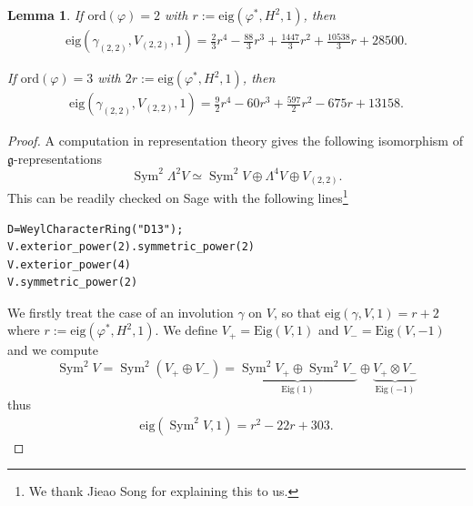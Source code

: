 \documentclass[a4paper,11pt]{amsart}
\newcommand{\eig}{{\mathrm{eig}}}
\newcommand{\Eig}{{\mathrm{Eig}}}
\newcommand{\V}[2]{V_{(#1,#2)}}
\newcommand{\ord}{{\mathrm{ord}}}
\DeclareMathOperator{\Sym}{Sym}
\theoremstyle{plain}
\newtheorem{lemma}[satz]{Lemma}
\theoremstyle{remark}
\begin{document}
\begin{lemma}\label{lem:V22-compuation}
If $\ord(\varphi) = 2$ with $r:=\eig(\varphi^*, H^2,1)$, then
    \begin{align}\label{eq:ord2-V22}
    \eig (\gamma_{(2,2)}, \V22, 1) =  \frac{2}{3}r^4 - \frac{88}{3}r^3 + \frac{1447}{3}r^2 + \frac{10538}{3}r + 28500.
    \end{align}
    
If $\ord(\varphi) = 3$ with $2r:=\eig(\varphi^*,H^2,1)$, then
    \begin{align}\label{eq:ord3-V22}
        \eig (\gamma_{(2,2)}, \V22, 1) =\frac{9}{2}r^4 - 60r^3 + \frac{597}{2}r^2 - 675r + 13158.
    \end{align}
\end{lemma}
\begin{proof}
A computation in representation theory
 gives the following isomorphism of $\mathfrak g$-representations
        \[
        \Sym^2 \Lambda^2 V \simeq \Sym^2 V \oplus \Lambda^4 V \oplus \V22.
        \] 
This can be readily checked on Sage \cite{sage} with the following lines\footnote{We thank Jieao Song for explaining this to us.}
\begin{verbatim}
D=WeylCharacterRing("D13");
V.exterior_power(2).symmetric_power(2)
V.exterior_power(4)
V.symmetric_power(2)
\end{verbatim}
We firstly treat the case of an involution $\gamma$ on $V$, so that $\eig(\gamma,V,1) = r+2$ where $r:= \eig(\varphi^*,H^2,1)$. We define $V_+ = \Eig(V,1)$ and $V_- = \Eig(V,-1)$ and we compute
\[
\Sym^2V = \Sym^2(V_+\oplus V_-) = \underbrace{\Sym^2 V_+ \oplus \Sym^2 V_-}_{\Eig(1)} \oplus \underbrace{V_+\otimes V_-}_{\Eig(-1)}
\]
thus 
\begin{align}\label{formula_2}
\eig(\Sym^2 V,1) = 
r^2-22r+303.
\end{align}


\end{proof}
\end{document}
